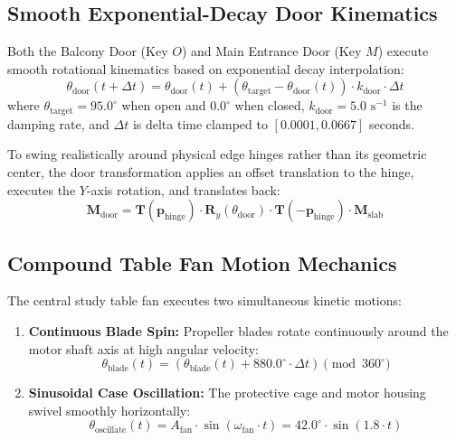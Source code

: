 \documentclass[11pt,a4paper]{article}
\begin{document}
\subsection{Smooth Exponential-Decay Door Kinematics}
Both the Balcony Door (Key $O$) and Main Entrance Door (Key $M$) execute smooth rotational kinematics based on exponential decay interpolation:
\begin{equation}
    \theta_{\text{door}}(t + \Delta t) = \theta_{\text{door}}(t) + \left(\theta_{\text{target}} - \theta_{\text{door}}(t)\right) \cdot k_{\text{door}} \cdot \Delta t
\end{equation}
where $\theta_{\text{target}} = 95.0^\circ$ when open and $0.0^\circ$ when closed, $k_{\text{door}} = 5.0\text{ s}^{-1}$ is the damping rate, and $\Delta t$ is delta time clamped to $[0.0001, 0.0667]$ seconds.

To swing realistically around physical edge hinges rather than its geometric center, the door transformation applies an offset translation to the hinge, executes the $Y$-axis rotation, and translates back:
\begin{equation}
    \mathbf{M}_{\text{door}} = \mathbf{T}(\mathbf{p}_{\text{hinge}}) \cdot \mathbf{R}_y(\theta_{\text{door}}) \cdot \mathbf{T}(-\mathbf{p}_{\text{hinge}}) \cdot \mathbf{M}_{\text{slab}}
\end{equation}

\subsection{Compound Table Fan Motion Mechanics}
The central study table fan executes two simultaneous kinetic motions:
\begin{enumerate}[leftmargin=1.2em, itemsep=1.0pt]
    \item \textbf{Continuous Blade Spin:} Propeller blades rotate continuously around the motor shaft axis at high angular velocity:
    \begin{equation}
        \theta_{\text{blade}}(t) = \left(\theta_{\text{blade}}(t) + 880.0^\circ \cdot \Delta t\right) \pmod{360^\circ}
    \end{equation}
    \item \textbf{Sinusoidal Case Oscillation:} The protective cage and motor housing swivel smoothly horizontally:
    \begin{equation}
        \theta_{\text{oscillate}}(t) = A_{\text{fan}} \cdot \sin\left(\omega_{\text{fan}} \cdot t\right) = 42.0^\circ \cdot \sin\left(1.8 \cdot t\right)
    \end{equation}
\end{enumerate}
\end{document}
